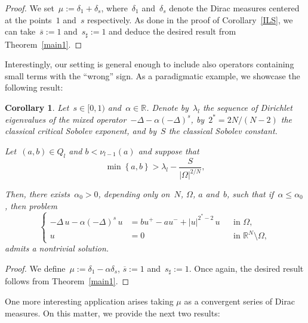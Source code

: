 \documentclass[12pt,a4paper,intlimits,sumlimits]{amsart}
\def \R {\mathbb{R}}
\newcommand{\set}[1]{\left\{#1\right\}}
\theoremstyle{definition}
\theoremstyle{plain}
\newtheorem{corollary}[definition]{Corollary}
\numberwithin{equation}{section}
\renewcommand{\le}{\leqslant}
\begin{document}
\begin{proof}
We set~$
\mu:= \delta_1 +\delta_s$, where~$\delta_1$ and~$\delta_s$ denote the Dirac measures centered at the points~$1$ and~$s$ respectively. As done in the proof of Corollary~\ref{ILS},
we can take~$\overline s:=1$ and~$s_\sharp:=1$ and deduce the desired result from
Theorem~\ref{main1}.
\end{proof}

Interestingly, our setting is general enough to include also operators containing small terms with the ``wrong'' sign. As a paradigmatic example, we showcase the following result:

\begin{corollary}\label{mix_signed}
Let~$s\in [{{ 0 }}, 1)$ and~$\alpha\in\R$.
Denote by~$\lambda_l$ the sequence of Dirichlet eigenvalues of the mixed operator~$-\Delta - \alpha(-\Delta)^s$, by~$2^* = 2N/(N-2)$ the classical critical Sobolev exponent, and by~$S$ the classical Sobolev constant.

Let~$(a, b)\in Q_l$ and $b <\nu_{l-1}(a)$ and suppose that
\begin{equation*}
\min \set{a,b} > \lambda_l -\frac{S}{|\Omega|^{2/N}},
\end{equation*}

Then, there exists~$\alpha_0>0$, depending only on~$N$, $\Omega$, $a$ and~$b$, such that if~$\alpha\le\alpha_0$, then problem 
\begin{equation*}
\left\{\begin{aligned}
-\Delta \, u - \alpha(-\Delta)^s \, u & = bu^+ - au^- + |u|^{2^* - 2}\, u && \text{in } \Omega,\\
u & = 0 && \text{in } \R^N \setminus \Omega,
\end{aligned}\right.
\end{equation*} admits a nontrivial solution.\end{corollary}

\begin{proof}
We define~$\mu:= \delta_1 -\alpha\delta_s$, $\overline s:=1$ and~$s_\sharp:=1$.
Once again, the desired result follows from
Theorem~\ref{main1}.  
\end{proof}

One more interesting application arises taking $\mu$ as a convergent series of Dirac measures. On this matter, we provide the next two results:
\end{document}
